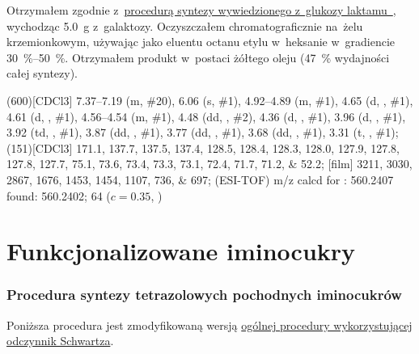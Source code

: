Otrzymałem zgodnie z~\hyperref[syn:glu-lactam]{procedurą syntezy wywiedzionego z~glukozy
  laktamu~}, wychodząc \SI{5.0}{\gram} z~galaktozy.
Oczyszczałem chromatograficznie na~żelu krzemionkowym,
  używając jako eluentu octanu etylu w~heksanie w~gradiencie \SIrange{30}{50}{\percent}.
Otrzymałem produkt w~postaci żółtego oleju (\SI{47}{\percent} wydajności całej syntezy).

\begin{fullexp}
  \NMR(600)[CDCl3] \numrange{7.37}{7.19} (m, \#{20}), \num{6.06} (s, \#{1}), \numrange{4.92}{4.89} (m, \#{1}), \num{4.65} (d, , \#{1}), \num{4.61} (d, , \#{1}), \numrange{4.56}{4.54} (m, \#{1}), \num{4.48} (dd, , \#{2}), \num{4.36} (d, , \#{1}), \num{3.96} (d, , \#{1}), \num{3.92} (td, , \#{1}), \num{3.87} (dd, , \#{1}), \num{3.77} (dd, , \#{1}), \num{3.68} (dd, , \#{1}), \num{3.31} (t, , \#{1}); 
  (151)[CDCl3] \numlist{171.1; 137.7; 137.5; 137.4; 128.5; 128.4; 128.3; 128.0; 127.9; 127.8; 127.8; 127.7; 75.1; 73.6; 73.4; 73.3; 73.1; 72.4; 71.7; 71.2; 52.2}; 
  [film] \numlist{3211; 3030; 2867; 1676; 1453; 1454; 1107; 736; 697}; 
   (ESI-TOF) m/z calcd for : \num{560.2407} found: \num{560.2402};
  \data{[$\alpha^{23}_D$]~$=$} \num{64} ($c = 0.35$, )
\end{fullexp}

\pagebreak  %
\section{Funkcjonalizowane iminocukry}\label{experimental:iminosugars}
\subsubsection{Procedura syntezy tetrazolowych pochodnych iminocukrów}\label{experimental:sugars:schwartz}
Poniższa procedura jest zmodyfikowaną wersją \hyperref[experimental:activation:schwartz]{%
  ogólnej procedury wykorzystującej odczynnik Schwartza}.

